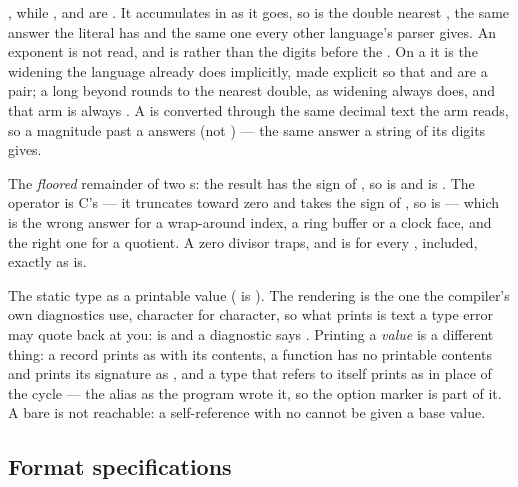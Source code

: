 \begin{description}[style=nextline,leftmargin=5.2em]
  , while ,  and
   are . It accumulates in  as it goes,
  so  is the double nearest , the same answer
  the literal  has and the same one every other language's parser
  gives. An exponent is not read, and is  rather than the digits
  before the . On a  it is the widening the language already
  does implicitly, made explicit so that  and  are a
  pair; a long beyond  rounds to the nearest
  double, as widening always does, and that arm is always .
  A  is converted through the same decimal text the  arm
  reads, so a magnitude past a  answers  (not )
  --- the same answer a string of its digits gives.
\item[\ic{mod(a, b)}] The \emph{floored} remainder of two s: the
  result has the sign of , so  is  and
   is . The \ic{\%} operator is C's --- it
  truncates toward zero and takes the sign of , so 
  is  --- which is the wrong answer for a wrap-around index, a ring
  buffer or a clock face, and the right one for a quotient. A zero divisor
  traps, and  is  for every , 
  included, exactly as \ic{\%} is.
\item[\ic{typeof(v)}] The static type as a printable value
  ( is ). The rendering is the one the
  compiler's own diagnostics use, character for character, so what
   prints is text a type error may quote back at you:
   is  and a diagnostic says
  . Printing a \emph{value} is a
  different thing: a record prints as  with its contents,
  a function has no printable contents and prints its signature as
  , and a type that refers to
  itself prints as  in place of the cycle --- the alias as the
  program wrote it, so the option marker is part of it. A bare  is not
  reachable: a self-reference with no  cannot be given a base value.
\end{description}

\subsection{Format specifications}
\label{sec:format-spec}

